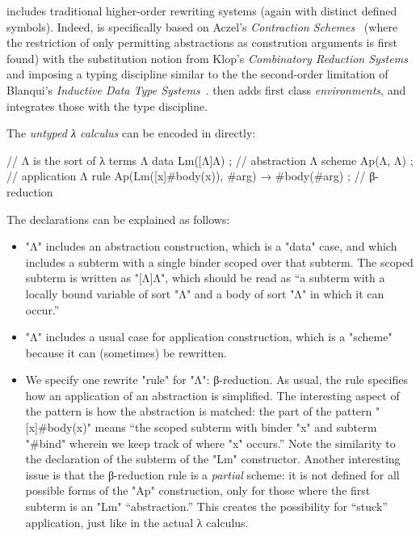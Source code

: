 \documentclass[letterpaper,11pt]{article}
\begin{document}
\hax includes traditional higher-order rewriting systems (again with distinct defined symbols).
Indeed, \hax is specifically based on Aczel's \emph{Contraction Schemes}~\cite{Aczel:1978} (where
the restriction of only permitting abstractions as constrution arguments is first found) with the
substitution notion from Klop's \emph{Combinatory Reduction Systems}~\cite{Klop+:tcs1993} and
imposing a typing discipline similar to the the second-order limitation of Blanqui's \emph{Inductive
  Data Type Systems}~\cite{BlanquiJouannaudOkada:tcs2002}. \hax then adds first class
\emph{environments}, and integrates those with the type discipline.

\begin{example}\label{ex:lambda}
  The \emph{untyped λ calculus} can be encoded in \hax directly:
  \begin{hacs}[numbers=right,texcl]
    // Λ is the sort of λ terms
    Λ  data Lm([Λ]Λ) ;                                        // abstraction
    Λ  scheme Ap(Λ, Λ) ;                                      // application
    Λ  rule Ap(Lm([x]#body(x)), #arg) →  #body(#arg) ;    // β-reduction
  \end{hacs}
  The declarations can be explained as follows:
  \begin{itemize}

  \item "Λ" includes an abstraction construction, which is a "data" case, and which includes a
    subterm with a single binder scoped over that subterm. The scoped subterm is written as
    "[Λ]Λ", which should be read as ``a subterm with a locally bound variable of sort "Λ" and a
    body of sort "Λ" in which it can occur.''

  \item "Λ" includes a usual case for application construction, which is a "scheme" because it
    can (sometimes) be rewritten.

  \item We specify one rewrite "rule" for "Λ": β-reduction. As usual, the rule specifies how an
    application of an abstraction is simplified. The interesting aspect of the pattern is how the
    abstraction is matched: the part of the pattern "[x]#body(x)" means ``the scoped subterm with
    binder "x" and subterm "#bind" wherein we keep track of where "x" occurs.'' Note the similarity
    to the declaration of the subterm of the "Lm" constructor. Another interesting issue is that the
    β-reduction rule is a \emph{partial} scheme: it is not defined for all possible forms of the
    "Ap" construction, only for those where the first subterm is an "Lm" ``abstraction.'' This
    creates the possibility for ``stuck'' application, just like in the actual λ calculus.


\end{itemize}
\end{example}
\end{document}
